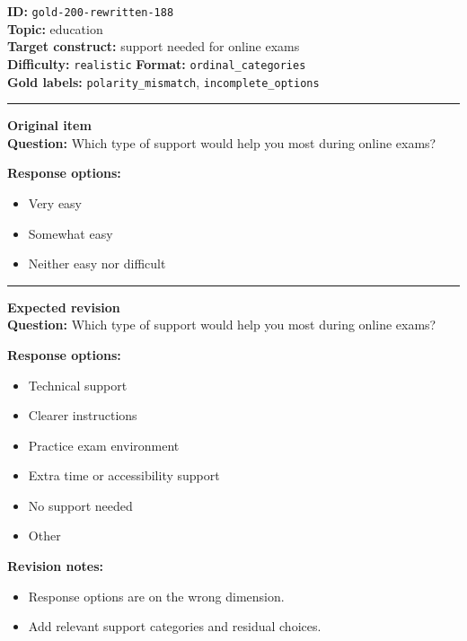 \documentclass[10pt,a4paper]{article}
\newcommand{\sectionline}{\vspace{0.15em}\hrule\vspace{0.35em}}
\begin{document}
\begin{tcolorbox}[colframe=FlawRed,colback=white,colbacktitle=FlawRed!9,coltitle=black,title={Item 188\hfill Flawed item}]
\textbf{ID:} \texttt{gold-200-rewritten-188}\\
\textbf{Topic:} education\\
\textbf{Target construct:} support needed for online exams\\
\textbf{Difficulty:} \texttt{realistic} \quad \textbf{Format:} \texttt{ordinal\_categories}\\
\textbf{Gold labels:} \texttt{polarity\_mismatch}, \texttt{incomplete\_options}\\
\sectionline
\textbf{Original item}\\
\textbf{Question:} Which type of support would help you most during online exams?
\par\textbf{Response options:}
\begin{itemize}
\item Very easy
\item Somewhat easy
\item Neither easy nor difficult
\end{itemize}
\sectionline
\textbf{Expected revision}\\
\textbf{Question:} Which type of support would help you most during online exams?
\par\textbf{Response options:}
\begin{itemize}
\item Technical support
\item Clearer instructions
\item Practice exam environment
\item Extra time or accessibility support
\item No support needed
\item Other
\end{itemize}
\par\textbf{Revision notes:}
\begin{itemize}
\item Response options are on the wrong dimension.
\item Add relevant support categories and residual choices.
\end{itemize}
\end{tcolorbox}
\end{document}
